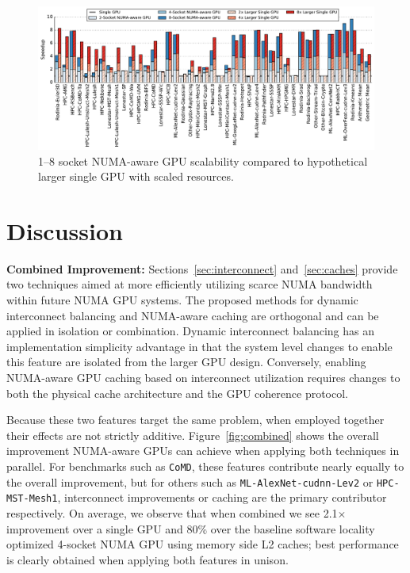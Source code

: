 \begin{figure}[t]
    \centering
    \includegraphics[width=1.0\textwidth]{figures/plot_scalability_mgpu_WB.pdf}
    \caption{1--8 socket NUMA-aware GPU scalability compared to hypothetical larger single GPU with scaled resources.}
    \label{fig:scalability}
    \vspace{-.2in}
\end{figure}

\section {Discussion}
\label{sec:discussion}
\textbf{Combined Improvement:} Sections~\ref{sec:interconnect} 
and~\ref{sec:caches} provide two techniques aimed at more efficiently utilizing 
scarce NUMA bandwidth within future NUMA GPU systems. The proposed methods
for dynamic interconnect balancing and NUMA-aware caching are orthogonal and 
can be applied in isolation or combination.  Dynamic interconnect balancing 
has an implementation simplicity advantage in that the system level changes to enable 
this feature are isolated from the larger GPU design.  Conversely, enabling 
NUMA-aware GPU caching based on interconnect utilization requires changes to both 
the physical cache architecture and the GPU coherence protocol.

Because these two features target the same problem, when employed 
together their effects are not strictly additive.  Figure~\ref{fig:combined} 
shows the overall improvement NUMA-aware GPUs can achieve when applying 
both techniques in parallel.  For benchmarks such as \texttt{CoMD}, these 
features contribute nearly equally to the overall improvement, but for others 
such as \texttt{ML-AlexNet-cudnn-Lev2} or \texttt{HPC-MST-Mesh1}, 
interconnect improvements or caching are the primary contributor 
respectively.  On average, we observe that when combined we see 2.1$\times$ 
improvement over a single GPU and 80\% 
over the baseline software locality optimized 4-socket NUMA GPU 
using memory side L2 caches;  best performance is clearly obtained when
applying both features in unison.

